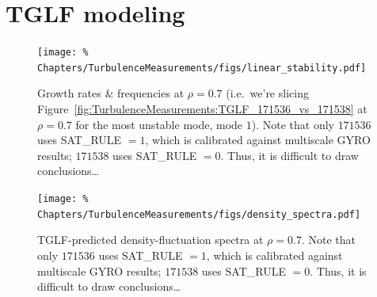 \section{TGLF modeling}
\begin{figure}[h!]
  \centering
  \texttt{[image: \%
    Chapters/TurbulenceMeasurements/figs/linear\_stability.pdf]}
  \caption[Growth rates \& frequencies at $\rho=0.7$]{%
    Growth rates \& frequencies at $\rho=0.7$
    (i.e.\ we're slicing
    Figure~\ref{fig:TurbulenceMeasurements:TGLF_171536_vs_171538}
    at $\rho = 0.7$ for the most unstable mode, mode $1$).
    Note that only $171536$ uses SAT\_RULE $= 1$,
    which is calibrated against multiscale GYRO results;
    $171538$ uses SAT\_RULE $= 0$.
    Thus, it is difficult to draw conclusions\ldots
  }
\label{fig:TurbulenceMeasurements:linear_stability}
\end{figure}

\begin{figure}[h!]
  \centering
  \texttt{[image: \%
    Chapters/TurbulenceMeasurements/figs/density\_spectra.pdf]}
  \caption[TGLF-predicted density-fluctuation spectra at $\rho=0.7$]{%
    TGLF-predicted density-fluctuation spectra at $\rho=0.7$.
    Note that only $171536$ uses SAT\_RULE $= 1$,
    which is calibrated against multiscale GYRO results;
    $171538$ uses SAT\_RULE $= 0$.
    Thus, it is difficult to draw conclusions\ldots
  }
\label{fig:TurbulenceMeasurements:density_spectra}
\end{figure}





